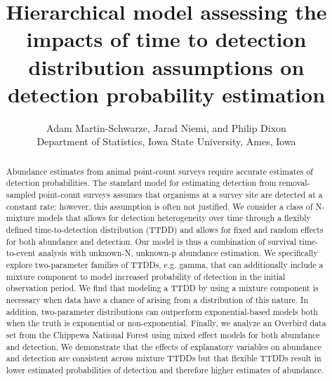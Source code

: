 \documentclass[12pt]{article}
\title{Hierarchical model assessing the impacts of time to detection distribution assumptions on detection probability estimation}
\author{Adam Martin-Schwarze, Jarad Niemi, and Philip Dixon\\
Department of Statistics, Iowa State University, Ames, Iowa}
\begin{document}
\maketitle
\newpage


\begin{abstract}

Abundance estimates from animal point-count surveys require accurate estimates of detection probabilities.  
The standard model for estimating detection from removal-sampled point-count surveys assumes that organisms at a survey site are detected at a constant rate; however, this assumption is often not justified.  
We consider a class of N-mixture models that allows for detection heterogeneity over time through a flexibly defined time-to-detection distribution (TTDD) and allows for fixed and random effects for both abundance and detection.
Our model is thus a combination of survival time-to-event analysis with unknown-N, unknown-p abundance estimation.  
We specifically explore two-parameter families of TTDDs, e.g. gamma, that can additionally include a mixture component to model increased probability of detection in the initial observation period.
We find that modeling a TTDD by using a mixture component is necessary when data have a chance of arising from a distribution of this nature.
In addition, two-parameter distributions can outperform exponential-based models both when the truth is exponential or non-exponential.
Finally, we analyze an Overbird data set from the Chippewa National Forest using mixed effect models for both abundance and detection.
We demonstrate that the effects of explanatory variables on abundance and detection are consistent across mixture TTDDs but that flexible TTDDs result in lower estimated probabilities of detection and therefore higher estimates of abundance. 

\end{abstract}
\end{document}
